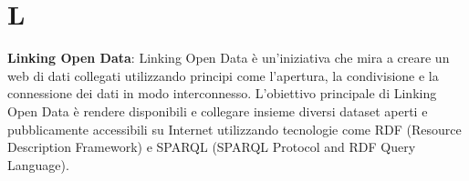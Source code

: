 \section{L}
\textbf{Linking Open Data}: Linking Open Data è un'iniziativa che mira a creare un web di dati collegati utilizzando principi come l'apertura, la condivisione e la connessione dei dati in modo interconnesso. L'obiettivo principale di Linking Open Data è rendere disponibili e collegare insieme diversi dataset aperti e pubblicamente accessibili su Internet utilizzando tecnologie come RDF (Resource Description Framework) e SPARQL (SPARQL Protocol and RDF Query Language).